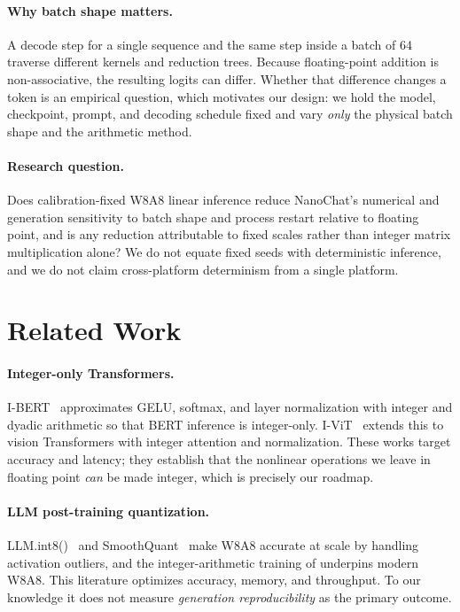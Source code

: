 \documentclass[10pt,twocolumn]{article}
\begin{document}
\paragraph{Why batch shape matters.} A decode step for a single sequence and the
same step inside a batch of 64 traverse different kernels and reduction trees.
Because floating-point addition is non-associative, the resulting logits can
differ. Whether that difference changes a token is an empirical question, which
motivates our design: we hold the model, checkpoint, prompt, and decoding
schedule fixed and vary \emph{only} the physical batch shape and the arithmetic
method.

\paragraph{Research question.} Does calibration-fixed W8A8 linear inference reduce
NanoChat's numerical and generation sensitivity to batch shape and process
restart relative to floating point, and is any reduction attributable to fixed
scales rather than integer matrix multiplication alone? We do not equate fixed
seeds with deterministic inference, and we do not claim cross-platform
determinism from a single platform.

\section{Related Work}
\paragraph{Integer-only Transformers.} I-BERT~\cite{kim2021ibert} approximates
GELU, softmax, and layer normalization with integer and dyadic arithmetic so
that BERT inference is integer-only. I-ViT~\cite{li2023ivit} extends this to
vision Transformers with integer attention and normalization. These works target
accuracy and latency; they establish that the nonlinear operations we leave in
floating point \emph{can} be made integer, which is precisely our roadmap.

\paragraph{LLM post-training quantization.} LLM.int8()~\cite{dettmers2022llmint8}
and SmoothQuant~\cite{xiao2023smoothquant} make W8A8 accurate at scale by
handling activation outliers, and the integer-arithmetic training of
\citet{jacob2018quantization} underpins modern W8A8. This literature optimizes
accuracy, memory, and throughput. To our knowledge it does not measure
\emph{generation reproducibility} as the primary outcome.
\end{document}
